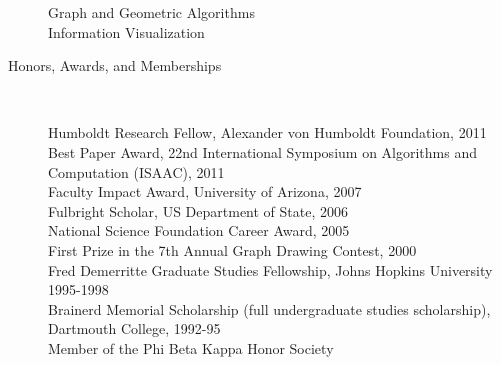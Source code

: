 \documentclass[10pt]{article}
\begin{document}
\begin{description}
Graph and Geometric Algorithms\\
Information Visualization



\vspace{-.1cm}\item [Honors, Awards, and Memberships]\

Humboldt Research Fellow, Alexander von Humboldt Foundation, 2011\\ 
Best Paper Award, 22nd International Symposium on Algorithms and
Computation (ISAAC), 2011\\
Faculty Impact Award, University of Arizona, 2007\\
Fulbright Scholar, US Department of State, 2006\\
National Science Foundation Career Award, 2005\\
First Prize in the 7th Annual Graph Drawing Contest, 2000\\
Fred Demerritte Graduate Studies Fellowship, Johns Hopkins University 1995-1998\\ 
Brainerd Memorial Scholarship (full undergraduate studies scholarship), Dartmouth College, 1992-95\\
Member of the Phi Beta Kappa Honor Society





\end{description}
\end{document}
